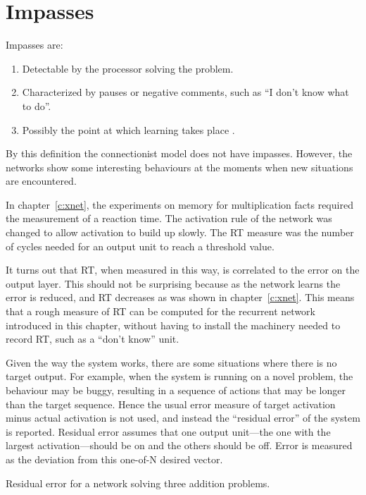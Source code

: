 \section{Impasses}\label{s:resed}

Impasses are:
\begin{enumerate}
\item Detectable by the processor solving the problem.
\item Characterized by pauses or negative comments, such as ``I
don't know what to
do''.
\item Possibly the point at which learning takes place
\cite{vanltowa,vanlrule}.
\end{enumerate}

By this definition the connectionist model does not have impasses.
However, the networks show some interesting behaviours at the moments when
new situations are encountered.

In chapter~\ref{c:xnet}, the experiments on memory for multiplication facts
required the measurement of a reaction time. The activation rule of the
network was changed to allow activation to build up slowly.  The RT
measure was the number of cycles needed for an output
unit to reach a threshold value.

It turns out that RT, when measured in this way, is correlated to the
error on the output layer.  This should not be surprising because as the
network learns the error is reduced, and RT decreases as was shown in
chapter~\ref{c:xnet}.  This means that a rough measure of RT can be
computed for the recurrent network introduced in this chapter, without
having to install the machinery needed to record RT, such as
a ``don't know'' unit.


Given the way the system works, there
are some situations where there is no target output.  For
example, when the system is running on a novel problem, the behaviour may
be buggy, resulting in a sequence of actions that may be longer than the
target sequence.  Hence the usual error measure of target
activation minus actual
activation
is not
used, and instead the ``residual error'' of the system is reported.
 Residual error assumes that
one output unit---the one with the largest activation---should
be on and the others should be off.  Error is measured as the deviation
from this one-of-N desired vector.

\begin{fancyfigure}
\centerline{}
\caption{Residual error for a network solving three addition
problems.}\label{f:reshort}
\end{fancyfigure}

